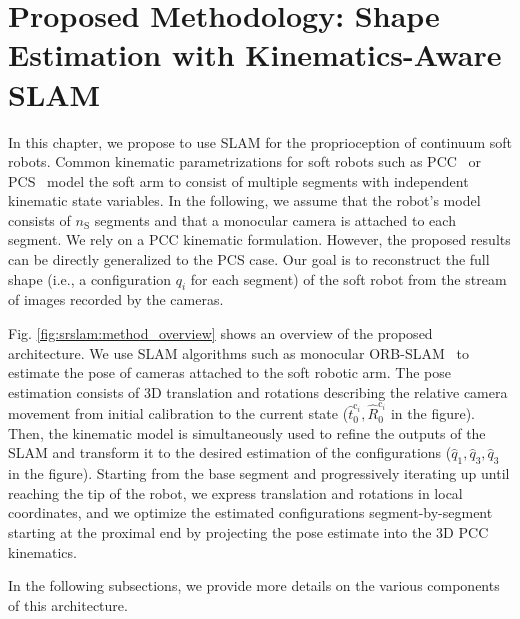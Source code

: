\section{Proposed Methodology: Shape Estimation with Kinematics-Aware SLAM}
\label{sec:srslam:pose_estimation}

In this chapter, we propose to use \gls{SLAM} for the proprioception of continuum soft robots. Common kinematic parametrizations for soft robots such as \gls{PCC}~\citep{webster2010design} or \gls{PCS}~\citep{renda2018discrete} model the soft arm to consist of multiple segments with independent kinematic state variables. 
In the following, we assume that the robot's model consists of $n_{\mathrm{S}}$ segments and that a monocular camera is attached to each segment. We rely on a \gls{PCC} kinematic formulation. However, the proposed results can be directly generalized to the PCS case.
%
%
Our goal is to reconstruct the full shape (i.e., a configuration $q_i$ for each segment) of the soft robot from the stream of images recorded by the cameras.

Fig. \ref{fig:srslam:method_overview} shows an overview of the proposed architecture.
%
We use \gls{SLAM} algorithms such as monocular ORB-SLAM~\citep{mur2017orb} to estimate the pose of cameras attached to the soft robotic arm.  The pose estimation consists of 3D translation and rotations describing the relative camera movement from initial calibration to the current state ($\hat{t}_0^{\mathrm{c}_i},\hat{R}_0^{\mathrm{c}_i}$ in the figure). Then, the kinematic model is simultaneously used to refine the outputs of the SLAM and transform it to the desired estimation of the configurations ($\hat{q}_1,\hat{q}_3,\hat{q}_3$ in the figure). Starting from the base segment and progressively iterating up until reaching the tip of the robot, we express translation and rotations in local coordinates, and we optimize the estimated configurations segment-by-segment starting at the proximal end by projecting the pose estimate into the 3D \gls{PCC} kinematics.

In the following subsections, we provide more details on the various components of this architecture.

